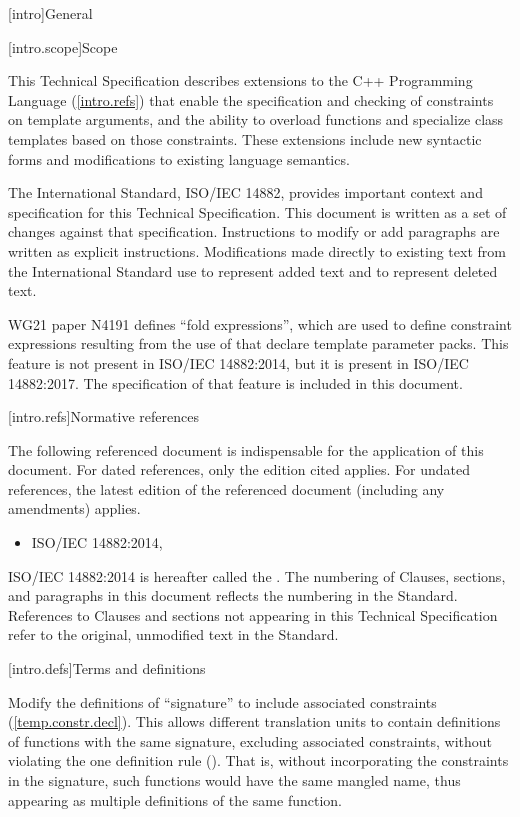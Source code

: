 
[intro]{General}

[intro.scope]{Scope}

\pnum
This Technical Specification describes extensions to the C++ 
Programming Language (\ref{intro.refs}) that
enable the specification and checking of constraints on template 
arguments, and the ability to overload functions and specialize
class templates based on those constraints. These extensions include 
new syntactic forms and modifications to existing language semantics.

\pnum
The International Standard, ISO/IEC 14882, provides important context
and specification for this Technical Specification. This document is 
written as a set of changes against that specification. Instructions
to modify or add paragraphs are written as explicit instructions. 
Modifications made directly to existing text from the International
Standard use  to represent added text and
 to represent deleted text.

\pnum
WG21 paper N4191 defines ``fold expressions'', which are used to define 
constraint expressions resulting from the use of 
 that declare template parameter
packs. This feature is not present in ISO/IEC 14882:2014, but it is
present in ISO/IEC 14882:2017. The specification of that feature is
included in this document.


[intro.refs]{Normative references}

\pnum
The following referenced document is indispensable for the
application of this document. For dated references, only the
edition cited applies. For undated references, the latest edition
of the referenced document (including any amendments) applies.

\begin{itemize}
\item ISO/IEC 14882:2014, 
\end{itemize}

ISO/IEC 14882:2014 is hereafter called the .
%
The numbering of Clauses, sections, and paragraphs in this document
reflects the numbering in the \Cpp Standard. References to Clauses
and sections not appearing in this Technical Specification refer to
the original, unmodified text in the \Cpp Standard.

[intro.defs]{Terms and definitions}

Modify the definitions of ``signature'' to include associated
constraints (\ref{temp.constr.decl}). This allows different translation units
to contain definitions of functions with the same signature, excluding 
associated constraints, without violating the one definition rule 
(). That is, without incorporating the constraints
in the signature, such functions would have the same mangled name, thus
appearing as multiple definitions of the same function.


